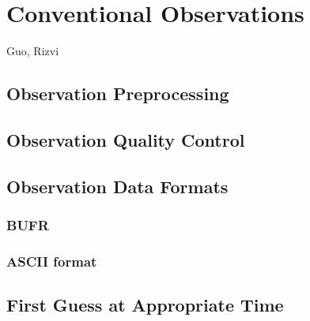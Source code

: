 \chapter{Conventional Observations}
\label{obs}

Guo, Rizvi

\section{Observation Preprocessing}

\section{Observation Quality Control}

\section{Observation Data Formats}

\subsection{BUFR}
\label{bufr}

\subsection{ASCII format}
\label{ascii}

\section{First Guess at Appropriate Time}

